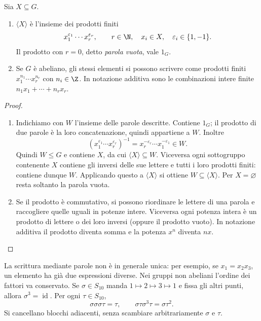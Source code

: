 \begin{proposizione}\label{prop:generato-parole}
Sia $X\subseteq G$.
\begin{enumerate}[label=\arabic*.]
\item $\langle X\rangle$ è l'insieme dei prodotti finiti
\[
x_1^{\varepsilon_1}\cdots x_r^{\varepsilon_r},\qquad
r\in\N,\quad x_i\in X,\quad\varepsilon_i\in\{1,-1\}.
\]
Il prodotto con $r=0$, detto \emph{parola vuota}, vale $1_G$.
\item Se $G$ è abeliano, gli stessi elementi si possono scrivere come prodotti finiti $x_1^{n_1}\cdots x_r^{n_r}$ con $n_i\in\Z$. In notazione additiva sono le combinazioni intere finite $n_1x_1+\cdots+n_rx_r$.
\end{enumerate}
\end{proposizione}
\begin{proof}
\begin{enumerate}[label=\arabic*.]
\item Indichiamo con $W$ l'insieme delle parole descritte. Contiene $1_G$; il prodotto di due parole è la loro concatenazione, quindi appartiene a $W$. Inoltre
\[
(x_1^{\varepsilon_1}\cdots x_r^{\varepsilon_r})^{-1}
=x_r^{-\varepsilon_r}\cdots x_1^{-\varepsilon_1}\in W.
\]
Quindi $W\le G$ e contiene $X$, da cui $\langle X\rangle\subseteq W$. Viceversa ogni sottogruppo contenente $X$ contiene gli inversi delle sue lettere e tutti i loro prodotti finiti: contiene dunque $W$. Applicando questo a $\langle X\rangle$ si ottiene $W\subseteq\langle X\rangle$. Per $X=\varnothing$ resta soltanto la parola vuota.
\item Se il prodotto è commutativo, si possono riordinare le lettere di una parola e raccogliere quelle uguali in potenze intere. Viceversa ogni potenza intera è un prodotto di lettere o dei loro inversi (oppure il prodotto vuoto). In notazione additiva il prodotto diventa somma e la potenza $x^n$ diventa $nx$.
\end{enumerate}
\end{proof}

La scrittura mediante parole non è in generale unica: per esempio, se $x_1=x_2x_3$, un elemento ha già due espressioni diverse. Nei gruppi non abeliani l'ordine dei fattori va conservato. Se $\sigma\in S_{10}$ manda $1\mapsto2\mapsto3\mapsto1$ e fissa gli altri punti, allora $\sigma^3=\operatorname{id}$. Per ogni $\tau\in S_{10}$,
\[
\sigma\sigma\sigma\tau=\tau,\qquad
\sigma\tau\sigma^3\tau=\sigma\tau^2.
\]
Si cancellano blocchi adiacenti, senza scambiare arbitrariamente $\sigma$ e $\tau$.

